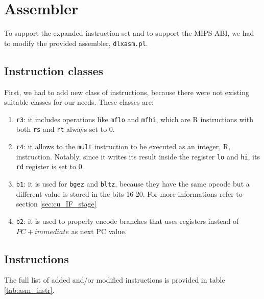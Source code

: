 \chapter{Assembler}
\label{chap:assembler}

To support the expanded instruction set and to support the MIPS ABI, we had to modify the provided assembler, \verb|dlxasm.pl|.

\section{Instruction classes}

First, we had to add new class of instructions, because there were not existing suitable classes for our needs. These classes are:

\begin{enumerate}
    \item \verb|r3|: it includes operations like \verb|mflo| and \verb|mfhi|, which are R instructions with both \verb|rs| and \verb|rt| always set to 0.
    \item \verb|r4|: it allows to the \verb|mult| instruction to be executed as an integer, R, instruction. Notably, since it writes its result inside the register \verb|lo| and \verb|hi|, its \verb|rd| register is set to 0.
    \item \verb|b1|: it is used for \verb|bgez| and \verb|bltz|, because they have the same opcode but a different value is stored in the bits 16-20. For more informations refer to section \ref{sec:cu_IF_stage}
    \item \verb|b2|: it is used to properly encode branches that uses registers instead of $PC + immediate$ as next PC value.
\end{enumerate}

\section{Instructions}

The full list of added and/or modified instructions is provided in table \ref{tab:asm_instr}.

